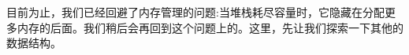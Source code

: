 目前为止，我们已经回避了内存管理的问题:当堆栈耗尽容量时，它隐藏在分配更多内存的后面。我们稍后会再回到这个问题上的。这里，先让我们探索一下其他的数据结构。


































